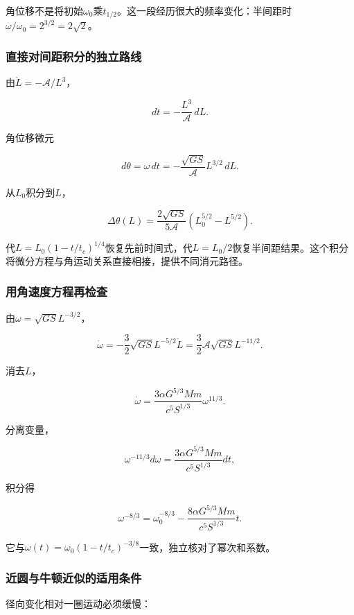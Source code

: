 \documentclass[12pt,a4paper,fontset=fandol]{ctexart}
\begin{document}
角位移不是将初始\(\omega_0\)乘\(t_{1/2}\)。这一段经历很大的频率变化：半间距时\(\omega/\omega_0=2^{3/2}=2\sqrt2\)。

\subsubsection{直接对间距积分的独立路线}\label{ux76f4ux63a5ux5bf9ux95f4ux8dddux79efux5206ux7684ux72ecux7acbux8defux7ebf}

由\(\dot L=-\mathcal A/L^3\)，

\[
dt=-\frac{L^3}{\mathcal A}\,dL.
\]

角位移微元

\[
d\theta=\omega\,dt
=-\frac{\sqrt{GS}}{\mathcal A}L^{3/2}\,dL.
\]

从\(L_0\)积分到\(L\)，

\[
\boxed{
\Delta\theta(L)
=\frac{2\sqrt{GS}}{5\mathcal A}
(L_0^{5/2}-L^{5/2})}.
\]

代\(L=L_0(1-t/t_c)^{1/4}\)恢复先前时间式，代\(L=L_0/2\)恢复半间距结果。这个积分将微分方程与角运动关系直接相接，提供不同消元路径。

\subsubsection{用角速度方程再检查}\label{ux7528ux89d2ux901fux5ea6ux65b9ux7a0bux518dux68c0ux67e5}

由\(\omega=\sqrt{GS}L^{-3/2}\)，

\[
\dot\omega=-\frac32\sqrt{GS}L^{-5/2}\dot L
=\frac32\mathcal A\sqrt{GS}L^{-11/2}.
\]

消去\(L\)，

\[
\boxed{
\dot\omega
=\frac{3\alpha G^{5/3}Mm}
{c^5S^{1/3}}\omega^{11/3}}.
\]

分离变量，

\[
\omega^{-11/3}d\omega
=\frac{3\alpha G^{5/3}Mm}{c^5S^{1/3}}dt,
\]

积分得

\[
\omega^{-8/3}
=\omega_0^{-8/3}
-\frac{8\alpha G^{5/3}Mm}{c^5S^{1/3}}t.
\]

它与\(\omega(t)=\omega_0(1-t/t_c)^{-3/8}\)一致，独立核对了幂次和系数。

\subsubsection{近圆与牛顿近似的适用条件}\label{ux8fd1ux5706ux4e0eux725bux987fux8fd1ux4f3cux7684ux9002ux7528ux6761ux4ef6}

径向变化相对一圈运动必须缓慢：
\end{document}
